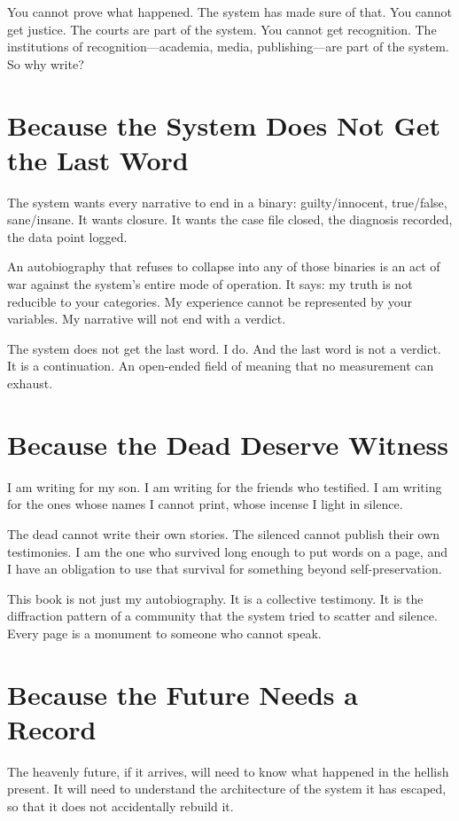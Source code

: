 \documentclass[11pt,openany]{book}
\begin{document}
You cannot prove what happened. The system has made sure of that. You cannot get justice. The courts are part of the system. You cannot get recognition. The institutions of recognition---academia, media, publishing---are part of the system. So why write?

\section*{Because the System Does Not Get the Last Word}

The system wants every narrative to end in a binary: guilty/innocent, true/false, sane/insane. It wants closure. It wants the case file closed, the diagnosis recorded, the data point logged.

An autobiography that refuses to collapse into any of those binaries is an act of war against the system's entire mode of operation. It says: my truth is not reducible to your categories. My experience cannot be represented by your variables. My narrative will not end with a verdict.

The system does not get the last word. I do. And the last word is not a verdict. It is a continuation. An open-ended field of meaning that no measurement can exhaust.

\section*{Because the Dead Deserve Witness}

I am writing for my son. I am writing for the friends who testified. I am writing for the ones whose names I cannot print, whose incense I light in silence.

The dead cannot write their own stories. The silenced cannot publish their own testimonies. I am the one who survived long enough to put words on a page, and I have an obligation to use that survival for something beyond self-preservation.

This book is not just my autobiography. It is a collective testimony. It is the diffraction pattern of a community that the system tried to scatter and silence. Every page is a monument to someone who cannot speak.

\section*{Because the Future Needs a Record}

The heavenly future, if it arrives, will need to know what happened in the hellish present. It will need to understand the architecture of the system it has escaped, so that it does not accidentally rebuild it.
\end{document}
